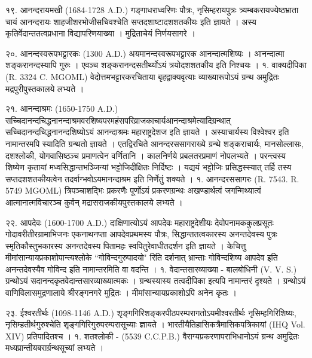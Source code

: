 १९. आनन्दरायमखी (1684-1728 A.D.)
गङ्गाधराध्वरिणः पौत्रः, नृसिम्हरायपुत्रः त्र्यम्बकरायज्येष्ठभ्राता चायं आनन्दरायः शाहजीशरभोजीसचिवश्चेति सप्तदशाष्टादशशतकीयः इति ज्ञायते । अस्य कृतिर्वेदान्ततत्वप्रधाना विद्यापरिणयाख्या । मुद्रिताचेयं निर्णयसागरे ।

२०. आनन्दस्वरूपभट्टारकः (1300 A.D.)
अयमानन्दस्वरूपभट्टारक आनन्दात्मशिष्यः । आनन्दात्मा शङ्करानन्दस्यापि गुरुः । एवञ्च शङ्करानन्दसतीर्थ्योऽयं त्रयोदशशतकीय इति निश्चयः ।
१. वाक्यदीपिका (R. 3324 C. MGOML)
वेदोत्तमभट्टारकरचिताया बृहद्वाक्यवृत्याः व्याख्यारूपोऽयं ग्रन्थ अमुद्रितः मद्रपुरीपुस्तकालये लभ्यते ।

२१. आनन्दाश्रमः (1650-1750 A.D.)
सच्चिदानन्दचिद्धनानन्दाश्रमवरशिष्यपरमहंसपरिव्राजकाचार्यआनन्दाश्रमेत्यादिग्रन्थात् सच्चिदानन्दचिद्धनानन्दशिष्योऽयं आनन्दाश्रमः महाराष्ट्रदेशज इति ज्ञायते । अस्याचार्यस्य विश्वेश्वर इति नामान्तरमपि स्यादिति ग्रन्थतो ज्ञायते । एतद्विरचिते आनन्दरससागराख्ये ग्रन्थे शङ्कराचार्यः, मानसोल्लासः, दशश्लोकी, योगवासिष्ठञ्च प्रमाणत्वेन वर्णितानि ।
कालनिर्णये प्रबलतरप्रमाणं नोपलभ्यते । परन्त्वस्य शिष्येण कृतायां मध्वसिद्धान्तभञ्जिन्यां भट्टोजिदीक्षितः निर्दिष्टः । यद्ययं भट्टोजिः प्रसिद्धस्स्यात् तर्हि तस्य सप्तदशशतकीयत्वेन तदर्वाग्भवोऽयमानन्दाश्रम इति निर्णेतुं शक्यते ।
१. आनन्दरससागरः (R. 7543. R. 5749 MGOML)
त्रिपञ्चाशद्भिः प्रकरणैः पूर्णोऽयं प्रकरणग्रन्थः अखण्डार्थत्वं जगन्मिथ्यात्वं आत्मानात्मविचारञ्च कुर्वन् मद्रासराजकीयपुस्तकालये लभ्यते ।

२२. आपदेवः (1600-1700 A.D.)
दाक्षिणात्योऽयं आपदेवः महाराष्ट्रदेशीयः देवोपनामककुलप्रसूतः गोदावरीतीरग्रामाभिजनः एकनाथनप्ता आपदेवप्रथमस्य पौत्रः, सिद्धान्ततत्वकारस्य अनन्तदेवस्य पुत्रः स्मृतिकौस्तुभकारस्य अनन्तदेवस्य पितामहः स्वपितुरेवाधीतदर्शन इति ज्ञायते ।
केचित्तु मीमांसान्यायप्रकाशोपान्त्यश्लोके ``गोविन्दगुरुपादयो" रिति दर्शनात् भ्रान्ताः गोविन्दशिष्य आपदेव इति अनन्तदेवस्यैव गोविन्द इति नामान्तरमिति वा वदन्ति ।
१. वेदान्तसारव्याख्या - बालबोधिनी (V. V. S.)
ग्रन्थोऽयं सदानन्दकृतवेदान्तसारव्याख्यात्मकः । ग्रन्थस्यास्य तत्वदीपिका इत्यपि नामान्तरं दृश्यते । ग्रन्थोऽयं वाणिविलासमुद्रणालाये श्रीरङ्गनगरे मुद्रितः । मीमांसान्यायप्रकाशोऽपि अनेन कृतः ।

२३. ईश्वरतीर्थः (1098-1146 A.D.)
शृङ्गगिरिशङ्करपीठपरम्परागतोऽयमीश्वरतीर्थः नृसिम्हगिरिशिष्यः, नृसिम्हतीर्थगुरुश्चेति शृङ्गगिरिगुरुपरम्परासूच्याः ज्ञायते । भारतीयैतिहासिकत्रैमासिकपत्रिकायां (IHQ Vol. XIV) प्रतिपादितश्च ।
१. शतश्लोकी - (5539 C.C.P.B.) वैराग्यप्रकरणापराभिधानोऽयं ग्रन्थ अमुद्रितः मध्यप्रान्तीयबरार्ग्रन्थसूच्यां लभ्यते ।

